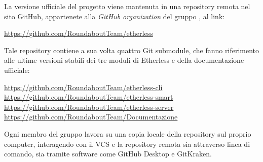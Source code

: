         La versione ufficiale del progetto viene mantenuta in una repository remota nel sito GitHub, appartenete alla \textit{GitHub organization} del gruppo \Gruppo{}, al link:
        \begin{center}
          \url{https://github.com/RoundaboutTeam/etherless}
        \end{center}
    	Tale repository contiene a sua volta quattro Git submodule, che fanno riferimento alle ultime versioni stabili dei tre moduli di Etherless e della documentazione ufficiale:
    	\begin{center}
    		\url{https://github.com/RoundaboutTeam/etherless-cli}
    		\url{https://github.com/RoundaboutTeam/etherless-smart}
    		\url{https://github.com/RoundaboutTeam/etherless-server}
    		\url{https://github.com/RoundaboutTeam/Documentazione}
    	\end{center}
        Ogni membro del gruppo lavora su una copia locale della repository sul proprio computer, interagendo con il VCS e la repository remota sia attraverso linea di comando, sia tramite software come GitHub Desktop e GitKraken.

